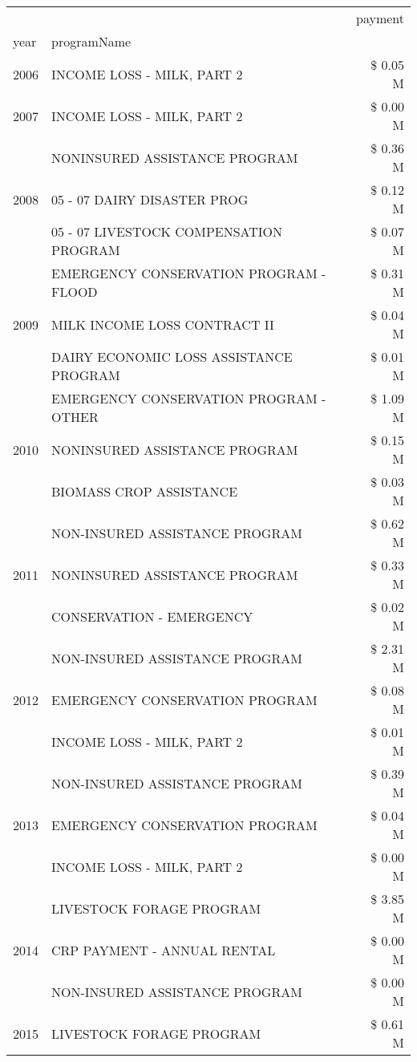 \begin{tabular}{llr}
\toprule
 &  & payment \\
year & programName &  \\
\midrule
2006 & INCOME LOSS - MILK, PART 2 & \$ 0.05 M \\
\cline{1-3}
2007 & INCOME LOSS - MILK, PART 2 & \$ 0.00 M \\
\cline{1-3}
\multirow[t]{3}{*}{2008} & NONINSURED ASSISTANCE PROGRAM & \$ 0.36 M \\
 & 05 - 07 DAIRY DISASTER PROG & \$ 0.12 M \\
 & 05 - 07 LIVESTOCK COMPENSATION PROGRAM & \$ 0.07 M \\
\cline{1-3}
\multirow[t]{3}{*}{2009} & EMERGENCY CONSERVATION PROGRAM - FLOOD & \$ 0.31 M \\
 & MILK INCOME LOSS CONTRACT II & \$ 0.04 M \\
 & DAIRY ECONOMIC LOSS ASSISTANCE PROGRAM & \$ 0.01 M \\
\cline{1-3}
\multirow[t]{3}{*}{2010} & EMERGENCY CONSERVATION PROGRAM - OTHER & \$ 1.09 M \\
 & NONINSURED ASSISTANCE PROGRAM & \$ 0.15 M \\
 & BIOMASS CROP ASSISTANCE & \$ 0.03 M \\
\cline{1-3}
\multirow[t]{3}{*}{2011} & NON-INSURED ASSISTANCE PROGRAM & \$ 0.62 M \\
 & NONINSURED ASSISTANCE PROGRAM & \$ 0.33 M \\
 & CONSERVATION - EMERGENCY & \$ 0.02 M \\
\cline{1-3}
\multirow[t]{3}{*}{2012} & NON-INSURED ASSISTANCE PROGRAM & \$ 2.31 M \\
 & EMERGENCY CONSERVATION PROGRAM & \$ 0.08 M \\
 & INCOME LOSS - MILK, PART 2 & \$ 0.01 M \\
\cline{1-3}
\multirow[t]{3}{*}{2013} & NON-INSURED ASSISTANCE PROGRAM & \$ 0.39 M \\
 & EMERGENCY CONSERVATION PROGRAM & \$ 0.04 M \\
 & INCOME LOSS - MILK, PART 2 & \$ 0.00 M \\
\cline{1-3}
\multirow[t]{3}{*}{2014} & LIVESTOCK FORAGE PROGRAM & \$ 3.85 M \\
 & CRP PAYMENT - ANNUAL RENTAL & \$ 0.00 M \\
 & NON-INSURED ASSISTANCE PROGRAM & \$ 0.00 M \\
\cline{1-3}
\multirow[t]{3}{*}{2015} & LIVESTOCK FORAGE PROGRAM & \$ 0.61 M \\

\end{tabular}
